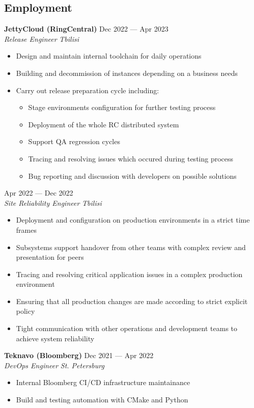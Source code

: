 \documentclass[10pt]{report}
\newenvironment{JobDescription}[5]{
    \vspace{ #5 }
    \flushleft
    {\bf #1 } \hfill { #2 }
    \\
    {\em #3 } \hfill {\em #4 }
    \begin{itemize}
} {
    \end{itemize}
}
\begin{document}
\subsection*{Employment}
\begin{JobDescription}{JettyCloud (RingCentral)}{Dec 2022 --- Apr 2023}{Release Engineer}{Tbilisi}{2mm}
    \item Design and maintain internal toolchain for daily operations
    \item Building and decommission of instances depending on a business needs
    \item Carry out release preparation cycle including:
    \begin{itemize}
        \item Stage environments configuration for further testing process
        \item Deployment of the whole RC distributed system
        \item Support QA regression cycles
        \item Tracing and resolving issues which occured during testing process
        \item Bug reporting and discussion with developers on possible solutions
    \end{itemize}
\end{JobDescription}

\begin{JobDescription}{}{Apr 2022 --- Dec 2022}{Site Reliability Engineer}{Tbilisi}{-3mm}
    \item Deployment and configuration on production environments in a strict time frames
    \item Subsystems support handover from other teams with complex review and
          presentation for peers
    \item Tracing and resolving critical application issues in a complex
          production environment
    \item Ensuring that all production changes are made according to strict
          explicit policy
    \item Tight communication with other operations and development teams
          to achieve system reliability
\end{JobDescription}

\begin{JobDescription}{Teknavo (Bloomberg)}{Dec 2021 --- Apr 2022}{DevOps Engineer}{St. Petersburg}{5mm}
    \item Internal Bloomberg CI/CD infrastructure maintainance
    \item Build and testing automation with CMake and Python
\end{JobDescription}
\end{document}
